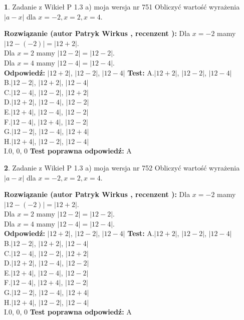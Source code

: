 \documentclass[12pt, a4paper]{article}
\theoremstyle{definition} %
\newtheorem{zad}{}
\newcommand{\zadStart}[1]{\begin{zad}#1\newline}
\newcommand{\zadStop}{\end{zad}}
\newcommand{\rozwStart}[2]{\noindent \textbf{Rozwiązanie (autor #1 , recenzent #2): }\newline}
\newcommand{\rozwStop}{\newline}
\newcommand{\odpStart}{\noindent \textbf{Odpowiedź:}\newline}
\newcommand{\odpStop}{\newline}
\newcommand{\testStart}{\noindent \textbf{Test:}\newline}
\newcommand{\testStop}{\newline}
\newcommand{\kluczStart}{\noindent \textbf{Test poprawna odpowiedź:}\newline}
\newcommand{\kluczStop}{\newline}
\begin{document}
\zadStart{Zadanie z Wikieł P 1.3 a) moja wersja nr 751}
Obliczyć wartość wyrażenia $|a - x|$ dla $x=-2,x=2,x=4$.
\zadStop
\rozwStart{Patryk Wirkus}{}
Dla $x = -2$ mamy $|12 - (-2)| = |12 + 2|$.\\
Dla $x = 2$ mamy $|12 - 2| = |12 - 2|$.\\
Dla $x = 4$ mamy $|12 - 4| = |12 - 4|$.\\
\rozwStop
\odpStart
$|12 + 2|$, $|12 - 2|$, $|12 - 4|$
\odpStop
\testStart
A.$|12 + 2|$, $|12 - 2|$, $|12 - 4|$\\
B.$|12 - 2|$, $|12 + 2|$, $|12 - 4|$\\
C.$|12 - 4|$, $|12 - 2|$, $|12 + 2|$\\
D.$|12 + 2|$, $|12 - 4|$, $|12 - 2|$\\
E.$|12 + 4|$, $|12 - 4|$, $|12 - 2|$\\
F.$|12 - 4|$, $|12 + 4|$, $|12 - 2|$\\
G.$|12 - 2|$, $|12 - 4|$, $|12 + 4|$\\
H.$|12 + 4|$, $|12 - 2|$, $|12 - 4|$\\
I.$0$, $0$, $0$
\testStop
\kluczStart
A
\kluczStop



\zadStart{Zadanie z Wikieł P 1.3 a) moja wersja nr 752}
Obliczyć wartość wyrażenia $|a - x|$ dla $x=-2,x=2,x=4$.
\zadStop
\rozwStart{Patryk Wirkus}{}
Dla $x = -2$ mamy $|12 - (-2)| = |12 + 2|$.\\
Dla $x = 2$ mamy $|12 - 2| = |12 - 2|$.\\
Dla $x = 4$ mamy $|12 - 4| = |12 - 4|$.\\
\rozwStop
\odpStart
$|12 + 2|$, $|12 - 2|$, $|12 - 4|$
\odpStop
\testStart
A.$|12 + 2|$, $|12 - 2|$, $|12 - 4|$\\
B.$|12 - 2|$, $|12 + 2|$, $|12 - 4|$\\
C.$|12 - 4|$, $|12 - 2|$, $|12 + 2|$\\
D.$|12 + 2|$, $|12 - 4|$, $|12 - 2|$\\
E.$|12 + 4|$, $|12 - 4|$, $|12 - 2|$\\
F.$|12 - 4|$, $|12 + 4|$, $|12 - 2|$\\
G.$|12 - 2|$, $|12 - 4|$, $|12 + 4|$\\
H.$|12 + 4|$, $|12 - 2|$, $|12 - 4|$\\
I.$0$, $0$, $0$
\testStop
\kluczStart
A
\kluczStop
\end{document}
